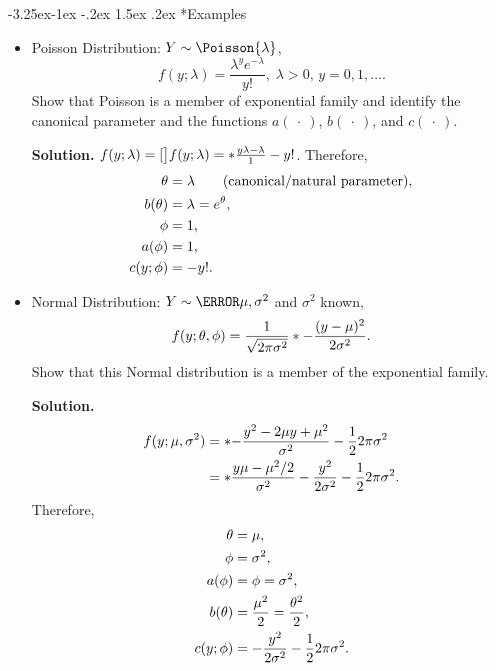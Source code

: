 \documentclass[final]{article}\usepackage[]{graphicx}\usepackage[svgnames]{xcolor}
\makeatletter
\renewcommand\subsection{\@startsection{subsection}{2}{\z@}%
                                     {-3.25ex\@plus -1ex \@minus -.2ex}%
                                     {1.5ex \@plus .2ex}%
                                     {\normalfont\large\bfseries\scshape\color{Blue}}}
\let\exp\relax%
\let\log\relax%
\makeatother
\begin{document}
\subsection*{Examples}
\begin{itemize}
    \item Poisson Distribution: $ Y \sim \Poisson{\lambda} $,
          \[ f(y;\lambda)=\frac{\lambda^y e^{-\lambda}}{y!},\; \lambda>0,\, y=0,1,\ldots.  \]
          Show that Poisson is a member of exponential family and identify the canonical
          parameter and the functions $ a(\:\cdot\:) $, $ b(\:\cdot\:) $, and $ c(\:\cdot\:) $.

          \textbf{Solution.} $ f(y;\lambda)=\exp[\big]{\log{f(y;\lambda)}}=\exp*{\frac{y\log{\lambda}-\lambda}{1} -\log{y!}} $. Therefore,
          \begin{align*}
              \theta    & =\log{\lambda}\qquad\text{(canonical/natural parameter)}, \\
              b(\theta) & =\lambda=e^{\theta},                                      \\
              \phi      & =1,                                                       \\
              a(\phi)   & =1,                                                       \\
              c(y;\phi) & =-\log{y!}.
          \end{align*}
    \item Normal Distribution: $ Y \sim \N{\mu,\sigma^2} $ and $ \sigma^2 $ known,
          \[ f(y;\theta,\phi)=\frac{1}{\sqrt{2\pi\sigma^2}}\exp*{-\frac{(y-\mu)^2}{2\sigma^2}}. \]
          Show that this Normal distribution is a member of the exponential family.

          \textbf{Solution.}
          \begin{align*}
              f(y;\mu,\sigma^2)
               & =\exp*{-\frac{y^2-2\mu y+\mu^2}{\sigma^2}-\frac{1}{2} \log{2\pi\sigma^2}}                   \\
               & =\exp*{\frac{y\mu-\mu^2/2}{\sigma^2}-\frac{y^2}{2\sigma^2}-\frac{1}{2} \log{2\pi\sigma^2}}.
          \end{align*}
          Therefore,
          \begin{align*}
              \theta    & =\mu,                                                   \\
              \phi      & =\sigma^2,                                              \\
              a(\phi)   & =\phi=\sigma^2,                                         \\
              b(\theta) & =\frac{\mu^2}{2}=\frac{\theta^2}{2},                    \\
              c(y;\phi) & =-\frac{y^2}{2\sigma^2}-\frac{1}{2} \log{2\pi\sigma^2}.
          \end{align*}
\end{itemize}
\end{document}
